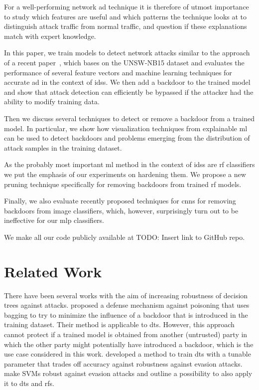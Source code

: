 \documentclass[10pt,sigconf,letterpaper,dvipsnames]{acmart}
\newcommand\note[2]{{\color{#1}#2}}
\newcommand\todo[1]{{\note{red}{TODO: #1}}}
\newcommand{\unsw}{UNSW-NB15}
\begin{document}
For a well-performing network \gls{ad} technique it is therefore of utmost importance to study which features are useful and which patterns the technique looks at to distinguish attack traffic from normal traffic, and question if these explanations match with expert knowledge.

In this paper, we train models to detect network attacks similar to the approach of a recent paper~\cite{meghdouri_analysis_2018}, which bases on the \unsw{} dataset \cite{moustafa_unsw-nb15:_2015} and evaluates the performance of several feature vectors and machine learning techniques for accurate \gls{ad} in the context of \glspl{ids}.
We then add a backdoor to the trained model and show that attack detection can efficiently be bypassed if the attacker had the ability to modify training data.

Then we discuss several techniques to detect or remove a backdoor from a trained model. In particular, we show how visualization techniques from explainable \gls{ml} can be used to detect backdoors and problems emerging from the distribution of attack samples in the training dataset.

As the probably most important \gls{ml} method in the context of \glspl{ids} are \gls{rf} classifiers we put the emphasis of our experiments on hardening them. We propose a new pruning technique specifically for removing backdoors from trained \gls{rf} models.

Finally, we also evaluate recently proposed techniques for \glspl{cnn} for removing backdoors from image classifiers, which, however, surprisingly turn out to be ineffective for our \gls{mlp} classifiers.

We make all our code publicly available at \todo{Insert link to GitHub repo}.

\section{Related Work}

There have been several works with the aim of increasing robustness of decision trees against attacks. \cite{biggio_bagging_2011} proposed a defense mechanism against poisoning that uses bagging to try to minimize the influence of a backdoor that is introduced in the training dataset. Their method is applicable to \glspl{dt}. However, this approach cannot protect if a trained model is obtained from another (untrusted) party in which the other party might potentially have introduced a backdoor, which is the use case considered in this work. \cite{chen_robust_2019} developed a method to train \glspl{dt} with a tunable parameter that trades off accuracy against robustness against evasion attacks. \cite{russu_secure_2016} make SVMs robust against evasion attacks and outline a possibility to also apply it to \glspl{dt} and \glspl{rf}.
\end{document}
